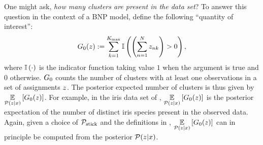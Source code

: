 

\begin{ex}

One might ask, \textit{how many clusters are present in the data set}? To answer
this question in the context of a BNP model, define the
following ``quantity of interest'':
%
\begin{align*}
  G_0(z) := \sum_{k=1}^{K_{\mathrm{max}}} \mathbb{I}\left( \left(\sum_{n=1}^{N}
  z_{nk}\right) > 0\right),
\end{align*}
%
where $\mathbb{I}\left(\cdot\right)$ is the indicator function taking value $1$ when the argument
is true and $0$ otherwise. $G_0$ counts the number of clusters with at
least one observations in a set of assignments $z$.  The posterior expected
number of clusters is thus given by $\underset{\mathcal{P}(z\vert x)}{\mathbb{E}}\left[G_0(z)\right]$.
For example, in the iris data set of ,
$\underset{\mathcal{P}(z\vert x)}{\mathbb{E}}\left[G_0(z)\right]$ is the posterior expectation of the
number of distinct iris species present in the observed data.
%
Again, given a choice of $\mathcal{P}_{\mathrm{stick}}$ and the definitions in
, $\underset{\mathcal{P}(z\vert x)}{\mathbb{E}}\left[G_0(z)\right]$ can in
principle be computed from the posterior $\mathcal{P}(z \vert x)$.
%
\end{ex}

